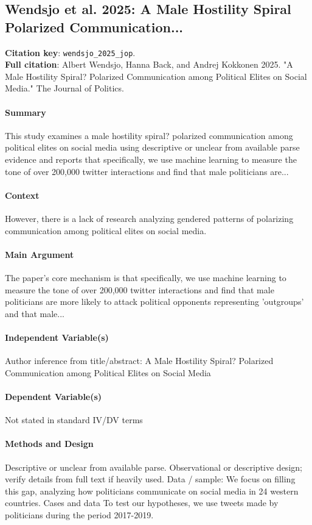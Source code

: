 \documentclass[12pt]{article}
\begin{document}
\subsection{Wendsjo et al. 2025: A Male Hostility Spiral Polarized Communication...}
\textbf{Citation key}: \texttt{wendsjo\_2025\_jop}.\\
\textbf{Full citation}: Albert Wendsjo, Hanna Back, and Andrej Kokkonen 2025. "A Male Hostility Spiral? Polarized Communication among Political Elites on Social Media." The Journal of Politics.

\paragraph{Summary} This study examines a male hostility spiral? polarized communication among political elites on social media using descriptive or unclear from available parse evidence and reports that specifically, we use machine learning to measure the tone of over 200,000 twitter interactions and find that male politicians are...

\paragraph{Context} However, there is a lack of research analyzing gendered patterns of polarizing communication among political elites on social media.

\paragraph{Main Argument} The paper's core mechanism is that specifically, we use machine learning to measure the tone of over 200,000 twitter interactions and find that male politicians are more likely to attack political opponents representing 'outgroups' and that male...

\paragraph{Independent Variable(s)} Author inference from title/abstract: A Male Hostility Spiral? Polarized Communication among Political Elites on Social Media

\paragraph{Dependent Variable(s)} Not stated in standard IV/DV terms

\paragraph{Methods and Design} Descriptive or unclear from available parse. Observational or descriptive design; verify details from full text if heavily used. Data / sample: We focus on filling this gap, analyzing how politicians communicate on social media in 24 western countries. Cases and data To test our hypotheses, we use tweets made by politicians during the period 2017-2019.
\end{document}
